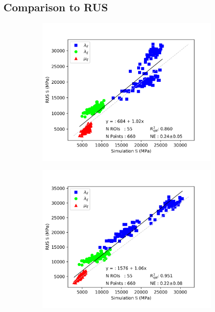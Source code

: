 \documentclass[a4paper,fleqn]{DC_ArtStyle}
\begin{document}
	\subsection{Comparison to RUS}
	\begin{figure}
		\begin{subfigure}[b]{0.45\linewidth}
			\includegraphics[width=\linewidth]{Elasticity_IsoRUS}
		\end{subfigure}
		\begin{subfigure}[b]{0.45\linewidth}
			\includegraphics[width=\linewidth]{Elasticity_TraRUS}
		\end{subfigure}
	\end{figure}
\end{document}
